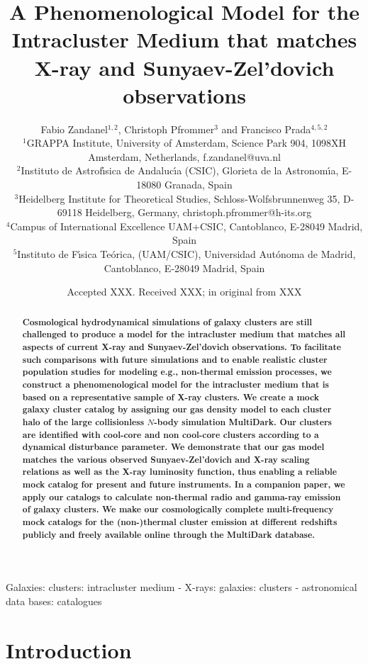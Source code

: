 \documentclass[useAMS,usenatbib]{mn2e}
\title[A Phenomenological Model for the Intracluster Medium]{A Phenomenological Model for the Intracluster Medium that matches X-ray and Sunyaev-Zel'dovich observations}
\author[F. Zandanel, C. Pfrommer and F. Prada]{
Fabio Zandanel$^{1,2}$, Christoph Pfrommer$^{3}$ and Francisco Prada$^{4,5,2}$\\
$^{1}$GRAPPA Institute, University of Amsterdam, Science Park 904, 1098XH Amsterdam, Netherlands, f.zandanel@uva.nl\\
$^{2}$Instituto de Astrof\'{\i}sica de Andaluc\'{\i}a (CSIC), Glorieta de la Astronom\'{\i}a, E-18080 Granada, Spain\\
$^{3}$Heidelberg Institute for Theoretical Studies, Schloss-Wolfsbrunnenweg 35, D-69118 Heidelberg, Germany, christoph.pfrommer@h-its.org\\
$^{4}$Campus of International Excellence UAM+CSIC, Cantoblanco, E-28049 Madrid, Spain\\
$^{5}$Instituto de F\'{\i}sica Te\'orica, (UAM/CSIC), Universidad Aut\'onoma de Madrid, Cantoblanco, E-28049 Madrid, Spain}
\begin{document}
\date{Accepted XXX. Received XXX; in original from XXX}

\pagerange{\pageref{firstpage}--\pageref{lastpage}} 

\maketitle

\label{firstpage}

\begin{abstract}
  {\bf Cosmological hydrodynamical simulations of galaxy clusters are still
    challenged to produce a model for the intracluster medium that matches all
    aspects of current X-ray and Sunyaev-Zel'dovich observations. To facilitate
    such comparisons with future simulations and to enable realistic cluster
    population studies for modeling e.g., non-thermal emission processes, we
    construct a phenomenological model for the intracluster medium that is based
    on a representative sample of X-ray clusters. We create a mock galaxy
    cluster catalog by assigning our gas density model to each cluster halo of
    the large collisionless $N$-body simulation MultiDark. Our clusters
    are identified with cool-core and non cool-core clusters according to a
    dynamical disturbance parameter. We demonstrate that our gas model matches
    the various observed Sunyaev-Zel'dovich and X-ray scaling relations as well
    as the X-ray luminosity function, thus enabling a reliable mock catalog for
    present and future instruments.  In a companion paper, we apply our catalogs
    to calculate non-thermal radio and gamma-ray emission of galaxy clusters. We
    make our cosmologically complete multi-frequency mock catalogs for the
    (non-)thermal cluster emission at different redshifts publicly and freely
    available online through the MultiDark database.}
\end{abstract}

\begin{keywords}
  Galaxies: clusters: intracluster medium - X-rays: galaxies: clusters - astronomical data bases: catalogues
\end{keywords}


\section{Introduction}
\label{sec:1}
\end{document}
